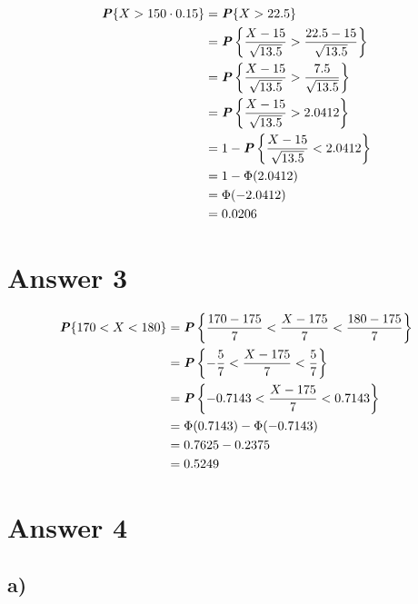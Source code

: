 \documentclass[12pt]{article}
\newcommand{\boldP}{\textbf{\textit{P}}}
\begin{document}
\vspace{-5mm}
\begin{align*}
  \boldP\{X > 150 \cdot 0.15\}
    &= \boldP\{X > 22.5\} \\
    &= \boldP \left\{ \frac{X - 15}{\sqrt{13.5}}
                    > \frac{22.5 - 15}{\sqrt{13.5}} \right\} \\
    &= \boldP \left\{ \frac{X - 15}{\sqrt{13.5}}
                    > \frac{7.5}{\sqrt{13.5}} \right\} \\
    &= \boldP \left\{ \frac{X - 15}{\sqrt{13.5}} > 2.0412 \right\} \\
    &= 1 - \boldP \left\{ \frac{X - 15}{\sqrt{13.5}} < 2.0412 \right\} \\
    &= 1 - \Phi(2.0412) \\
    &= \Phi(-2.0412) \\
    &= 0.0206
\end{align*}

\newpage

\section*{Answer 3}

\begin{align*}
  \boldP\{170 < X < 180\}
    &= \boldP \left\{ \frac{170 - 175}{7}
                    < \frac{X - 175}{7} < \frac{180 - 175}{7} \right\} \\
    &= \boldP \left\{ -\frac{5}{7} < \frac{X - 175}{7} < \frac{5}{7} \right\} \\
    &= \boldP \left\{ -0.7143 < \frac{X - 175}{7} < 0.7143 \right\} \\
    &= \Phi(0.7143) - \Phi(-0.7143) \\
    &= 0.7625 - 0.2375 \\
    &= 0.5249
\end{align*}

\section*{Answer 4}

\subsection*{a)}
\end{document}
